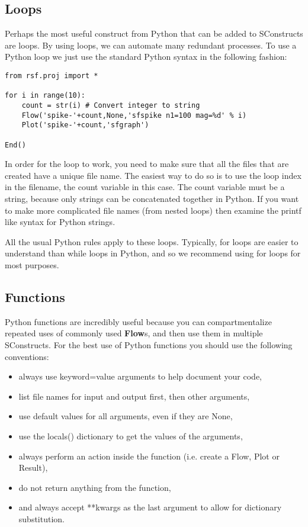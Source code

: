 \subsection{Loops}

Perhaps the most useful construct from Python that can be added to SConstructs are loops.  By using loops, we can automate many redundant processes.  To use a Python loop we just use the standard Python syntax in the following fashion:
\lstset{language=python,showstringspaces=false}
\begin{lstlisting}
from rsf.proj import *

for i in range(10):
	count = str(i) # Convert integer to string
	Flow('spike-'+count,None,'sfspike n1=100 mag=%d' % i)
	Plot('spike-'+count,'sfgraph')
	
End()
\end{lstlisting}
In order for the loop to work, you need to make sure that all the files that are created have a unique file name.  The easiest way to do so is to use the loop index in the filename, the count variable in this case.  The count variable must be a string, because only strings can be concatenated together in Python.   If you want to make more complicated file names (from nested loops) then examine the printf like syntax for Python strings. 

All the usual Python rules apply to these loops.  Typically, for loops are easier to understand than while loops in Python, and so we recommend using for loops for most purposes.

\subsection{Functions}

Python functions are incredibly useful because you can compartmentalize repeated uses of commonly used \textbf{Flow}s, and then use them in multiple SConstructs.  For the best use of Python functions you should use the following conventions:

\begin{itemize}
\item always use keyword=value arguments to help document your code,
\item list file names for input and output first, then other arguments,
\item use default values for all arguments, even if they are None,
\item use the locals() dictionary to get the values of the arguments,
\item always perform an action inside the function (i.e. create a Flow, Plot or Result),
\item do not return anything from the function,
\item and always accept **kwargs as the last argument to allow for dictionary substitution.
\end{itemize}

